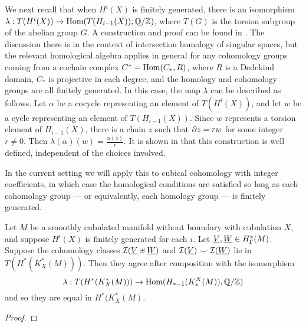 \documentclass{amsart}
\begin{document}
We next recall that when $H^i(X)$ is finitely generated, there is an isomorphism $\lambda:T(H^i(X))\to \textup{Hom}(T(H_{i-1}(X));\mathbb{Q}/\mathbb{Z})$, where $T(G)$ is the torsion subgroup of the abelian group $G$. A construction and proof can be found in \cite[Section 8.4.3]{Frie20}. The discussion there is in the context of intersection homology of singular spaces, but the relevant homological algebra applies in general for any cohomology groups coming from a cochain complex $C^*=\textup{Hom}(C_*,R)$, where $R$ is a Dedekind domain, $C_*$ is projective in each degree, and the homology and cohomology groups are all finitely generated. In this case, the map $\lambda$ can be described as follows. Let $\alpha$ be a cocycle representing an element of $T(H^i(X))$, and let $w$ be a cycle representing an element of $T(H_{i-1}(X))$. Since $w$ represents a torsion element of $H_{i-1}(X)$, there is a chain $z$ such that $\partial z=rw$ for some integer $r\neq 0$. Then $\lambda(\alpha)(w)=\frac{\alpha(z)}{r}$. It is shown in \cite{Frie20} that this construction is well defined, independent of the choices involved. 

In the current setting we will apply this to cubical cohomology with integer coefficients, in which case the homological conditions are satisfied so long as each cohomology group --- or equivalently, each homology group --- is finitely generated.  


\begin{proposition}
Let $M$ be a smoothly cubulated manifold without boundary with cubulation $X$, and suppose $H^i(X)$ is finitely generated for each $i$. Let $\underline{V},\underline{W}\in H^*_\Gamma(M)$. Suppose the cohomology classes $\mathcal{I}(\underline{V}\uplus\underline{W})$ and $\mathcal{I}(\underline{V}) \smile \mathcal{I}(\underline{W})$ lie in $T(H^*(K_X^*(M)))$. Then they agree after composition with the isomorphism $$\lambda:T(H^*(K_X^*(M)))\to \textup{Hom}(H_{*-1}(K_*^X(M)),\mathbb{Q}/\mathbb{Z})$$
and so they are equal in $H^*(K_X^*(M)$.
\end{proposition}

\begin{proof}

\end{proof}
\end{document}
